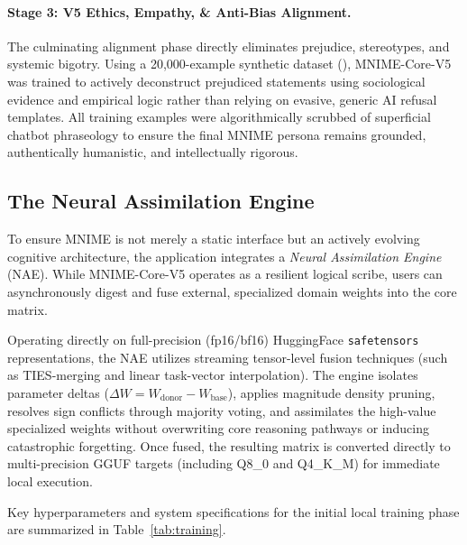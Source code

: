 \documentclass[11pt]{article}
\begin{document}
\paragraph{Stage 3: V5 Ethics, Empathy, \& Anti-Bias Alignment.} The culminating alignment phase directly eliminates prejudice, stereotypes, and systemic bigotry. Using a 20,000-example synthetic dataset (), MNIME-Core-V5 was trained to actively deconstruct prejudiced statements using sociological evidence and empirical logic rather than relying on evasive, generic AI refusal templates. All training examples were algorithmically scrubbed of superficial chatbot phraseology to ensure the final MNIME persona remains grounded, authentically humanistic, and intellectually rigorous.

\subsection{The Neural Assimilation Engine}

To ensure MNIME is not merely a static interface but an actively evolving cognitive architecture, the application integrates a \textit{Neural Assimilation Engine} (NAE). While MNIME-Core-V5 operates as a resilient logical scribe, users can asynchronously digest and fuse external, specialized domain weights into the core matrix. 

Operating directly on full-precision (fp16/bf16) HuggingFace \texttt{safetensors} representations, the NAE utilizes streaming tensor-level fusion techniques (such as TIES-merging and linear task-vector interpolation). The engine isolates parameter deltas ($\Delta W = W_{\text{donor}} - W_{\text{base}}$), applies magnitude density pruning, resolves sign conflicts through majority voting, and assimilates the high-value specialized weights without overwriting core reasoning pathways or inducing catastrophic forgetting. Once fused, the resulting matrix is converted directly to multi-precision GGUF targets (including Q8\_0 and Q4\_K\_M) for immediate local execution.

Key hyperparameters and system specifications for the initial local training phase are summarized in Table~\ref{tab:training}.
\end{document}
